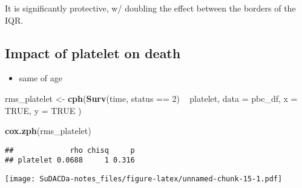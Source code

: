 \documentclass[]{book}
\newenvironment{Shaded}{\begin{snugshade}}{\end{snugshade}}
\newcommand{\KeywordTok}[1]{\textcolor[rgb]{0.13,0.29,0.53}{\textbf{{#1}}}}
\newcommand{\DataTypeTok}[1]{\textcolor[rgb]{0.13,0.29,0.53}{{#1}}}
\newcommand{\DecValTok}[1]{\textcolor[rgb]{0.00,0.00,0.81}{{#1}}}
\newcommand{\StringTok}[1]{\textcolor[rgb]{0.31,0.60,0.02}{{#1}}}
\newcommand{\OtherTok}[1]{\textcolor[rgb]{0.56,0.35,0.01}{{#1}}}
\newcommand{\NormalTok}[1]{{#1}}
\providecommand{\tightlist}{%
  \setlength{\itemsep}{0pt}\setlength{\parskip}{0pt}}
\theoremstyle{definition}
\theoremstyle{definition}
\theoremstyle{definition}
\theoremstyle{remark}
\begin{document}
It is significantly protective, w/ doubling the effect between the
borders of the IQR.

\subsection{\texorpdfstring{Impact of \textbf{platelet} on
death}{Impact of platelet on death}}\label{platelet2}

\begin{itemize}
\tightlist
\item
  same of age
\end{itemize}

\begin{Shaded}
\begin{Highlighting}[]
\NormalTok{rms_platelet <-}\StringTok{ }\KeywordTok{cph}\NormalTok{(}\KeywordTok{Surv}\NormalTok{(time, status ==}\StringTok{ }\DecValTok{2}\NormalTok{) ~}\StringTok{ }\NormalTok{platelet,}
  \DataTypeTok{data =} \NormalTok{pbc_df,}
  \DataTypeTok{x    =} \OtherTok{TRUE}\NormalTok{,}
  \DataTypeTok{y    =} \OtherTok{TRUE}
\NormalTok{)}

\KeywordTok{cox.zph}\NormalTok{(rms_platelet)}
\end{Highlighting}
\end{Shaded}

\begin{verbatim}
##             rho chisq     p
## platelet 0.0688     1 0.316
\end{verbatim}

\begin{Shaded}
\end{Shaded}

\texttt{[image: SuDACDa-notes\_files/figure-latex/unnamed-chunk-15-1.pdf]}

\begin{Shaded}
\end{Shaded}
\end{document}
